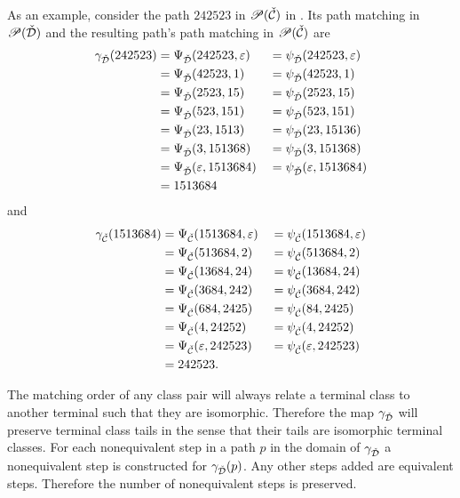As an example, consider the path $242523$ in $\mathscr{P}(\check{\mathcal{C}})$ in . Its path matching in $\mathscr{P}(\check{\mathcal{D}})$ and the resulting path's path matching in $\mathscr{P}(\check{\mathcal{C}})$ are
\begin{alignat*}{3}
    \gamma_{\check{\mathcal{D}}}(242523) &= \Psi_{\check{\mathcal{D}}}(242523, \varepsilon) &&= \psi_{\check{\mathcal{D}}}(242523, \varepsilon)\\
    &= \Psi_{\check{\mathcal{D}}}(42523,1) &&= \psi_{\check{\mathcal{D}}}(42523,1)\\
    &= \Psi_{\check{\mathcal{D}}}(2523,15) &&= \psi_{\check{\mathcal{D}}}(2523,15)\\
    &= \Psi_{\check{\mathcal{D}}}(523,151) &&= \psi_{\check{\mathcal{D}}}(523,151)\\
    &= \Psi_{\check{\mathcal{D}}}(23,1513) &&= \psi_{\check{\mathcal{D}}}(23,15136)\\
    &= \Psi_{\check{\mathcal{D}}}(3,151368) &&= \psi_{\check{\mathcal{D}}}(3,151368)\\
    &= \Psi_{\check{\mathcal{D}}}(\varepsilon,1513684) &&= \psi_{\check{\mathcal{D}}}(\varepsilon,1513684)\\
    &= 1513684
\end{alignat*}
and
\begin{alignat*}{3}
    \gamma_{\check{\mathcal{C}}}(1513684) &= \Psi_{\check{\mathcal{C}}}(1513684, \varepsilon) &&= \psi_{\check{\mathcal{C}}}(1513684, \varepsilon)\\
    &= \Psi_{\check{\mathcal{C}}}(513684, 2) &&= \psi_{\check{\mathcal{C}}}(513684, 2)\\
    &= \Psi_{\check{\mathcal{C}}}(13684, 24) &&= \psi_{\check{\mathcal{C}}}(13684, 24)\\
    &= \Psi_{\check{\mathcal{C}}}(3684, 242) &&= \psi_{\check{\mathcal{C}}}(3684, 242)\\
    &= \Psi_{\check{\mathcal{C}}}(684, 2425) &&= \psi_{\check{\mathcal{C}}}(84, 2425)\\
    &= \Psi_{\check{\mathcal{C}}}(4, 24252) &&= \psi_{\check{\mathcal{C}}}(4, 24252)\\
    &= \Psi_{\check{\mathcal{C}}}(\varepsilon, 242523) &&= \psi_{\check{\mathcal{C}}}(\varepsilon, 242523)\\
    &= 242523.
\end{alignat*}

The matching order of any class pair will always relate a terminal class to another terminal such that they are isomorphic. Therefore the map $\gamma_{\check{\mathcal{D}}}$ will preserve terminal class tails in the sense that their tails are isomorphic terminal classes. For each nonequivalent step in a path $p$ in the domain of $\gamma_{\check{\mathcal{D}}}$ a nonequivalent step is constructed for $\gamma_{\check{\mathcal{D}}}(p)$. Any other steps added are equivalent steps. Therefore the number of nonequivalent steps is preserved.

